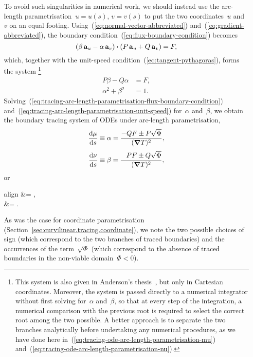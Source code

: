 To avoid such singularities in numerical work, we should instead use
the arc-length parametrisation~$u = u (s)$, $v = v(s)$
to put the two coordinates~$u$ and~$v$ on an equal footing.
Using~(\ref{eq:normal-vector-abbreviated})
and~(\ref{eq:gradient-abbreviated}),
the boundary condition~(\ref{eq:flux-boundary-condition}) becomes
\[
  \roundbr[\bulkysize]{\beta \basisvec{u} - \alpha \basisvec{v}}
    \dotp
  \roundbr[\bulkysize]{P \basisvec{u} + Q \basisvec{v}}
    =
  F,
\]
which, together with the unit-speed condition~(\ref{eq:tangent-pythagoras}),
forms the system%
\footnote{
  This system is also given
  in Anderson's thesis~\cite{anderson-2002-thesis-boundary-tracing-pdes},
  but only in Cartesian coordinates.
  Moreover, the system is passed directly to a numerical integrator
  without first solving for~$\alpha$ and~$\beta$,
  so that at every step of the integration,
  a numerical comparison with the previous root
  is required to select the correct root among the two possible.
  A better approach is to separate the two branches analytically
  before undertaking any numerical procedures,
  as we have done here
  in~(\ref{eq:tracing-ode-arc-length-parametrisation-mu})
  and~(\ref{eq:tracing-ode-arc-length-parametrisation-nu}).
}
\begin{align}
  P \beta - Q \alpha &= F,
    \label{eq:tracing-arc-length-parametrisation-flux-boundary-condition} \\
  \alpha^2 + \beta^2 &= 1.
    \label{eq:tracing-arc-length-parametrisation-unit-speed}
\end{align}
Solving~(\ref{eq:tracing-arc-length-parametrisation-flux-boundary-condition})
and~(\ref{eq:tracing-arc-length-parametrisation-unit-speed})
for~$\alpha$ and~$\beta$, we obtain
the boundary tracing system of ODEs under arc-length parametrisation,
\begin{align}
  \tder{\mu}{s} &\ideq \alpha = \frac{-Q F \pm P \sqrt{\Phi}}{(\del T)^2},
    \label{eq:tracing-ode-arc-length-parametrisation-mu} \\[\tallspace]
  \tder{\nu}{s} &\ideq \beta = \frac{\+P F \pm Q \sqrt{\Phi}}{(\del T)^2},
    \label{eq:tracing-ode-arc-length-parametrisation-nu}
\end{align}
or
\begin{important}{align}
   &= ,
    \label{eq:tracing-ode-arc-length-parametrisation-u} \\[\tallspace]
   &= .
    \label{eq:tracing-ode-arc-length-parametrisation-v}
\end{important}
As was the case for coordinate parametrisation
(Section~\ref{sec:curvilinear.tracing.coordinate}),
we note the two possible choices of sign
(which correspond to the two branches of traced boundaries)
and the occurrences of the term~$\sqrt{\Phi}$
(which correspond to the absence of traced boundaries
in the non-viable domain~$\Phi < 0$).

